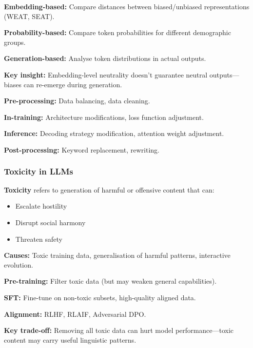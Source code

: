 \begin{defbox}
\textbf{Embedding-based:} Compare distances between biased/unbiased representations (WEAT, SEAT).

\textbf{Probability-based:} Compare token probabilities for different demographic groups.

\textbf{Generation-based:} Analyse token distributions in actual outputs.

\textbf{Key insight:} Embedding-level neutrality doesn't guarantee neutral outputs---biases can re-emerge during generation.
\end{defbox}

\begin{defbox}
\textbf{Pre-processing:} Data balancing, data cleaning.

\textbf{In-training:} Architecture modifications, loss function adjustment.

\textbf{Inference:} Decoding strategy modification, attention weight adjustment.

\textbf{Post-processing:} Keyword replacement, rewriting.
\end{defbox}

\bigseparator

\subsubsection{Toxicity in LLMs}

\begin{defbox}
\textbf{Toxicity} refers to generation of harmful or offensive content that can:
\begin{itemize}
  \item Escalate hostility
  \item Disrupt social harmony
  \item Threaten safety
\end{itemize}

\textbf{Causes:} Toxic training data, generalisation of harmful patterns, interactive evolution.
\end{defbox}

\begin{defbox}
\textbf{Pre-training:} Filter toxic data (but may weaken general capabilities).

\textbf{SFT:} Fine-tune on non-toxic subsets, high-quality aligned data.

\textbf{Alignment:} RLHF, RLAIF, Adversarial DPO.

\textbf{Key trade-off:} Removing all toxic data can hurt model performance---toxic content may carry useful linguistic patterns.
\end{defbox}

